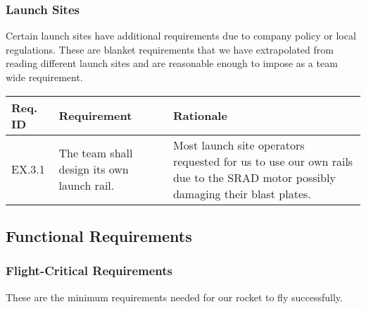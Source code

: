 \subsubsection{Launch Sites}
Certain launch sites have additional requirements due to company policy or local regulations. These are blanket requirements that we have extrapolated from reading different launch sites and are reasonable enough to impose as a team wide requirement.

\begin{table}[htbp]
    \centering
    \footnotesize 
    \setlength{\tymin}{40pt}
    \let\raggedright\RaggedRight
    
    \begin{tabulary}{\textwidth}{@{}LLL@{}}
    \toprule
        \textbf{Req. ID} & \textbf{Requirement} & \textbf{Rationale} \\
    \midrule
        EX.3.1 & The team shall design its own launch rail. & Most launch site operators requested for us to use our own rails due to the SRAD motor possibly damaging their blast plates. \\ 
    \bottomrule
    \end{tabulary}

    \label{table:launch-site-stakeholder}
\end{table}


\subsection{Functional Requirements}
\subsubsection{Flight-Critical Requirements}
These are the minimum requirements needed for our rocket to fly successfully.

